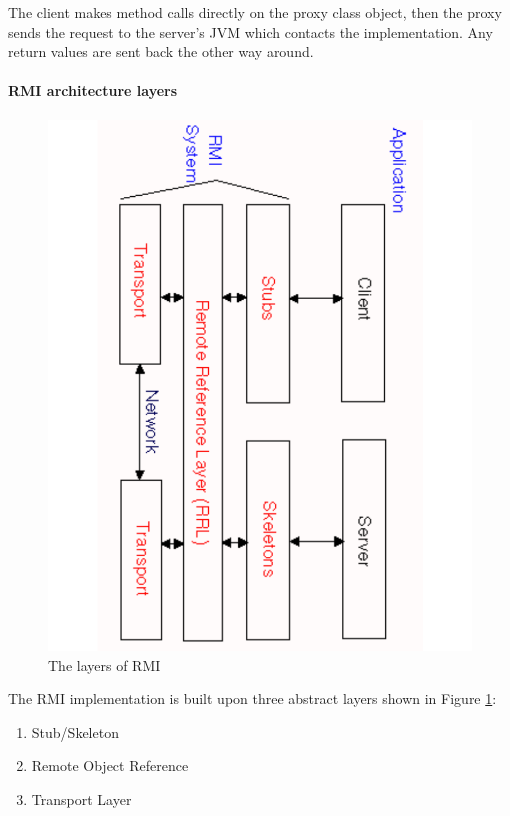 The client makes method calls directly on the proxy class object, then the proxy sends the request to the server's JVM which contacts the implementation. Any return values are sent back the other way around.

\paragraph{RMI architecture layers}
\label{RMIarchitectureLayers}

\begin{figure}
\begin{center}
\includegraphics[angle=90, scale=0.65]{pictures/rmi.pdf}
\caption{The layers of RMI}
\label{RMIlayers}
\end{center}
\end{figure}

The RMI implementation is built upon three abstract layers shown in Figure \ref{RMIlayers}:

\begin{enumerate}
\item Stub/Skeleton
\item Remote Object Reference
\item Transport Layer
\end{enumerate}

